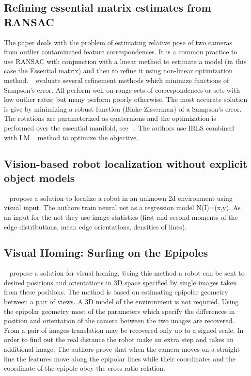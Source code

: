 \documentclass[10pt]{article}         %
\begin{document}
\subsection{Refining essential matrix estimates from RANSAC}
The paper deals with the problem of estimating relative pose of two
cameras from outlier contaminated feature correspondences.  It is a
common practice to use RANSAC with conjunction with a linear method to
estimate a model (in this case the Essential matrix) and then to
refine it using non-linear optimization
method. ~\cite{botterillrefining} evaluate several refinement methods
which minimize functions of Sampson's error.  All perform well on
range sets of correspondences or sets with low outlier rates; but many
perform poorly otherwise.  The most accurate solution is give by
minimizing a robust function (Blake-Zisserman) of a Sampson's error.
The rotations are parameterized as quaternions and the optimization is
performed over the essential manifold, see ~\cite{schmidt2001using}.
The authors use IRLS combined with LM ~\cite{marquardt1963algorithm}
method to optimize the objective.

\subsection{Vision-based robot localization without explicit object models}
~\cite{dudek1996vision} propose a solution to localize a robot in an
unknown 2d environment using visual input. The authors train neural
net as a regression model N(I)=(x,y).  As an input for the net they
use image statistics (first and second moments of the edge
distributions, mean edge orientations, densities of lines).

\subsection{Visual Homing: Surfing on the Epipoles}
~\cite{basri1999visual} propose a solution for visual homing.  Using
this method a robot can be sent to desired positions and orientations
in 3D space specified by single images taken from these positions.
The method is based on estimating epipolar geometry between a pair of
views. A 3D model of the environment is not required.  Using the
epipolar geometry most of the parameters which specify the differences
in position and orientation of the camera between the two images are
recovered.  From a pair of images translation may be recovered only up
to a signed scale.  In order to find out the real distance the robot
make an extra step and takes an additional image.  The authors prove
that when the camera moves on a straight line the features move along
the epipolar lines while their coordinates and the coordinate of the
epipole obey the cross-ratio relation.
\end{document}
